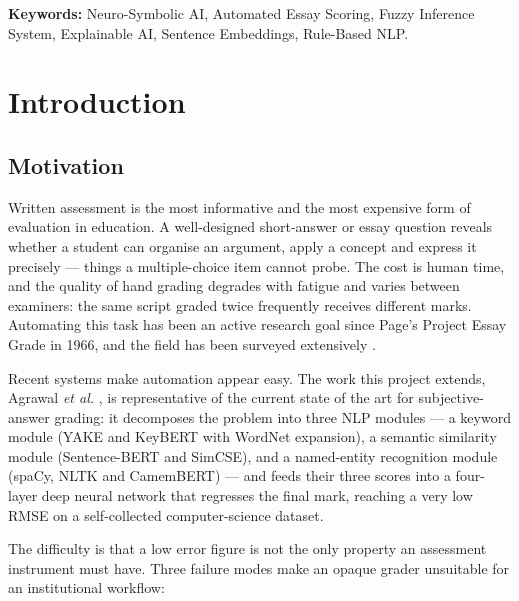 \documentclass[11pt,a4paper]{article}
\begin{document}
\vspace{0.6em}
\noindent\textbf{Keywords:} Neuro-Symbolic AI, Automated Essay Scoring, Fuzzy
Inference System, Explainable AI, Sentence Embeddings, Rule-Based NLP.

\newpage

\section{Introduction}

\subsection{Motivation}

Written assessment is the most informative and the most expensive form of
evaluation in education. A well-designed short-answer or essay question reveals
whether a student can organise an argument, apply a concept and express it
precisely --- things a multiple-choice item cannot probe. The cost is human time,
and the quality of hand grading degrades with fatigue and varies between
examiners: the same script graded twice frequently receives different marks.
Automating this task has been an active research goal since Page's Project Essay
Grade in 1966, and the field has been surveyed extensively \cite{ke2019}.

Recent systems make automation appear easy. The work this project extends,
Agrawal \emph{et al.} \cite{agrawal2024}, is representative of the current state
of the art for subjective-answer grading: it decomposes the problem into three
NLP modules --- a keyword module (YAKE and KeyBERT with WordNet expansion), a
semantic similarity module (Sentence-BERT and SimCSE), and a named-entity
recognition module (spaCy, NLTK and CamemBERT) --- and feeds their three scores
into a four-layer deep neural network that regresses the final mark, reaching a
very low RMSE on a self-collected computer-science dataset.

The difficulty is that a low error figure is not the only property an assessment
instrument must have. Three failure modes make an opaque grader unsuitable for an
institutional workflow:
\end{document}
